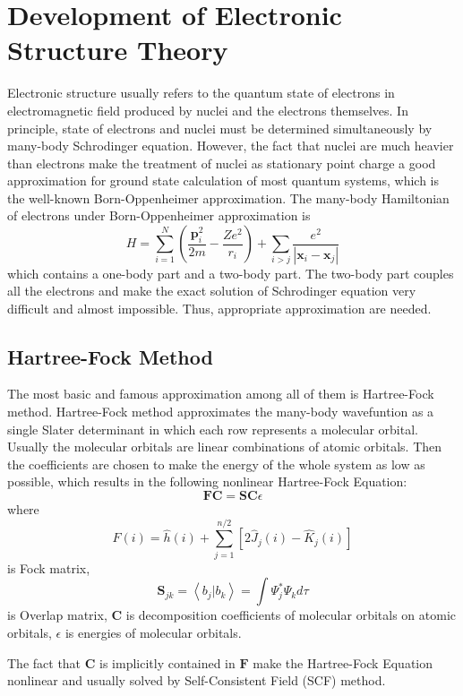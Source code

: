 
\chapter{Development of Electronic Structure Theory}
Electronic structure usually refers to the quantum state of electrons in electromagnetic field produced by nuclei and the electrons themselves.\cite{elecstruc}
In principle, state of electrons and nuclei must be determined simultaneously by many-body Schrodinger equation.
However, the fact that nuclei are much heavier than electrons make the treatment of nuclei as stationary point charge a good approximation for ground state calculation of most quantum systems, which is the well-known Born-Oppenheimer approximation.\cite{sakurai}
The many-body Hamiltonian of electrons under Born-Oppenheimer approximation is
$$
H=\sum_{i=1}^{N}\left(\frac{\boldsymbol{p}_{i}^{2}}{2 m}-\frac{Z e^{2}}{r_{i}}\right)+\sum_{i>j} \frac{e^{2}}{\left|\boldsymbol{x}_{i}-\boldsymbol{x}_{j}\right|}
$$
which contains a one-body part and a two-body part.
The two-body part couples all the electrons and make the exact solution of Schrodinger equation very difficult and almost impossible.
Thus, appropriate approximation are needed.


\section{Hartree-Fock Method}
The most basic and famous approximation among all of them is Hartree-Fock method.\cite{hartree}
Hartree-Fock method approximates the many-body wavefuntion as a single Slater determinant in which each row represents a molecular orbital. 
Usually the molecular orbitals are linear combinations of atomic orbitals. 
Then the coefficients are chosen to make the energy of the whole system as low as possible, which results in the following nonlinear Hartree-Fock Equation:
$$
\mathbf{F} \mathbf{C}=\mathbf{S} \mathbf{C} \epsilon
$$
where
$$
\hat{F}(i)=\hat{h}(i)+\sum_{j=1}^{n / 2}\left[2 \hat{J}_{j}(i)-\hat{K}_{j}(i)\right]
$$
is Fock matrix, 
$$
\mathbf{S}_{j k}=\left\langle b_{j} | b_{k}\right\rangle=\int \Psi_{j}^{*} \Psi_{k} d \tau
$$
is Overlap matrix,
$\mathbf{C}$ is decomposition coefficients of molecular orbitals on atomic orbitals,
$\epsilon$ is energies of molecular orbitals.

The fact that $\mathbf{C}$ is implicitly contained in $\mathbf{F}$ make the Hartree-Fock Equation nonlinear and usually solved by Self-Consistent Field (SCF) method.

